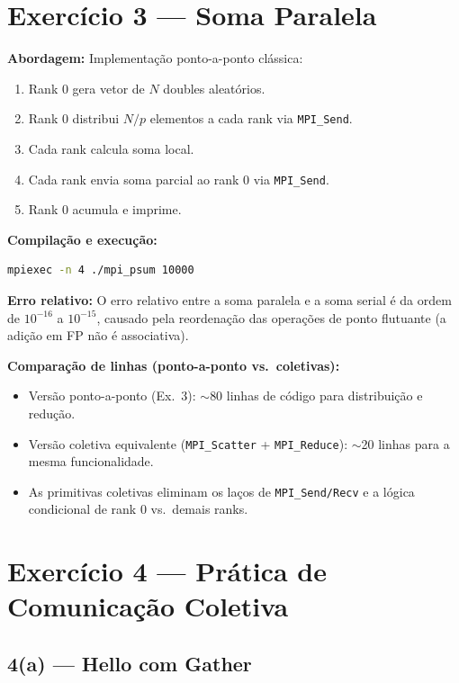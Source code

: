 \documentclass[12pt,a4paper]{article}
\begin{document}
\section{Exercício 3 — Soma Paralela}

\textbf{Abordagem:} Implementação ponto-a-ponto clássica:
\begin{enumerate}
    \item Rank 0 gera vetor de $N$ doubles aleatórios.
    \item Rank 0 distribui $N/p$ elementos a cada rank via \texttt{MPI\_Send}.
    \item Cada rank calcula soma local.
    \item Cada rank envia soma parcial ao rank 0 via \texttt{MPI\_Send}.
    \item Rank 0 acumula e imprime.
\end{enumerate}

\textbf{Compilação e execução:}
\begin{lstlisting}[language=bash]
mpiexec -n 4 ./mpi_psum 10000
\end{lstlisting}

\textbf{Erro relativo:} O erro relativo entre a soma paralela e a soma serial
é da ordem de $10^{-16}$ a $10^{-15}$, causado pela reordenação das operações
de ponto flutuante (a adição em FP não é associativa).

\textbf{Comparação de linhas (ponto-a-ponto vs.\ coletivas):}
\begin{itemize}
    \item Versão ponto-a-ponto (Ex.\ 3): $\sim$80 linhas de código para
    distribuição e redução.
    \item Versão coletiva equivalente (\texttt{MPI\_Scatter} + \texttt{MPI\_Reduce}):
    $\sim$20 linhas para a mesma funcionalidade.
    \item As primitivas coletivas eliminam os laços de \texttt{MPI\_Send/Recv} e a
    lógica condicional de rank 0 vs.\ demais ranks.
\end{itemize}

\section{Exercício 4 — Prática de Comunicação Coletiva}

\subsection{4(a) — Hello com Gather}
\end{document}

